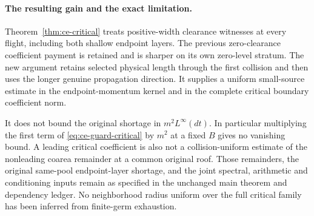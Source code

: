 \paragraph{The resulting gain and the exact limitation.}
Theorem~\ref{thm:ce-critical} treats positive-width
clearance witnesses at every flight, including both
shallow endpoint layers.  The previous zero-clearance
coefficient payment is retained and is sharper on its
own zero-level stratum.  The new argument retains
selected physical length through the first collision
and then uses the longer genuine propagation direction.
It supplies a uniform small-source estimate in the
endpoint-momentum kernel and in the complete critical
boundary coefficient norm.

It does not bound the original shortage in
$m^2L^\infty(dt)$.  In particular multiplying the first
term of \eqref{eq:ce-guard-critical} by $m^2$ at a fixed
$B$ gives no vanishing bound.  A leading critical
coefficient is also not a collision-uniform estimate of
the nonleading coarea remainder at a common original
roof.  Those remainders, the original same-pool
endpoint-layer shortage, and the joint spectral,
arithmetic and conditioning inputs remain as specified
in the unchanged main theorem and dependency ledger.
No neighborhood radius uniform over the full critical
family has been inferred from finite-germ exhaustion.

